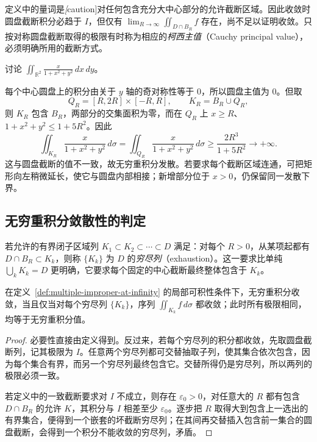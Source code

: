 定义中的量词是\emph[caution]{对任何包含充分大中心部分的允许截断区域}。因此收敛时圆盘截断积分必趋于 $I$，但仅有 $\lim_{R\to\infty}\iint_{D\cap B_R}f$ 存在，尚不足以证明收敛。只按对称圆盘截断取得的极限有时称为相应的\emph{柯西主值}（Cauchy principal value），必须明确所用的截断方式。

\begin{example}
\label{ex:multiple-principal-value-not-convergence}
讨论 $\displaystyle\iint_{\mathbb R^2}\frac{x}{1+x^2+y^2}\,dx\,dy$。
\end{example}
\begin{solve}
每个中心圆盘上的积分由关于 $y$ 轴的奇对称性等于 $0$，所以圆盘主值为 $0$。但取
\[
    Q_R=[R,2R]\times[-R,R],\qquad K_R=B_R\cup Q_R,
\]
则 $K_R$ 包含 $B_R$，两部分的交集面积为零，而在 $Q_R$ 上 $x\geq R$、$1+x^2+y^2\leq1+5R^2$。因此
\[
    \iint_{K_R}\frac{x}{1+x^2+y^2}\,d\sigma
    =\iint_{Q_R}\frac{x}{1+x^2+y^2}\,d\sigma
    \geq\frac{2R^3}{1+5R^2}\to+\infty.
\]
这与圆盘截断的值不一致，故无穷重积分发散。若要求每个截断区域连通，可把矩形向左稍微延长，使它与圆盘内部相接；新增部分位于 $x>0$，仍保留同一发散下界。
\end{solve}

\subsection{无穷重积分敛散性的判定}
\label{subsec:convergence-of-infinite-multiple-integrals}

\begin{definition}
\label{def:multiple-exhaustion}
若允许的有界闭子区域列 $K_1\subset K_2\subset\cdots\subset D$ 满足：对每个 $R>0$，从某项起都有 $D\cap B_R\subset K_k$，则称 $\{K_k\}$ 为 $D$ 的\emph{穷尽列}（exhaustion）。这一要求比单纯 $\bigcup_kK_k=D$ 更明确，它要求每个固定的中心截断最终整体包含于 $K_k$。
\end{definition}

\begin{theorem}
\label{thm:multiple-improper-exhaustion}
在定义~\ref{def:multiple-improper-at-infinity} 的局部可积性条件下，无穷重积分收敛，当且仅当对每个穷尽列 $\{K_k\}$，序列 $\iint_{K_k}f\,d\sigma$ 都收敛；此时所有极限相同，均等于无穷重积分值。
\end{theorem}
\begin{proof}
必要性直接由定义得到。反过来，若每个穷尽列的积分都收敛，先取圆盘截断列，记其极限为 $I$。任意两个穷尽列都可交替抽取子列，使其集合依次包含，因为每个集合有界，而另一个穷尽列最终包含它。交替所得仍是穷尽列，所以两列的极限必须一致。

若定义中的一致截断要求对 $I$ 不成立，则存在 $\varepsilon_0>0$，对任意大的 $R$ 都有包含 $D\cap B_R$ 的允许 $K$，其积分与 $I$ 相差至少 $\varepsilon_0$。逐步把 $R$ 取得大到包含上一选出的有界集合，便得到一个嵌套的坏截断穷尽列；在其间再交替插入包含前一集合的圆盘截断，会得到一个积分不能收敛的穷尽列，矛盾。
\end{proof}

